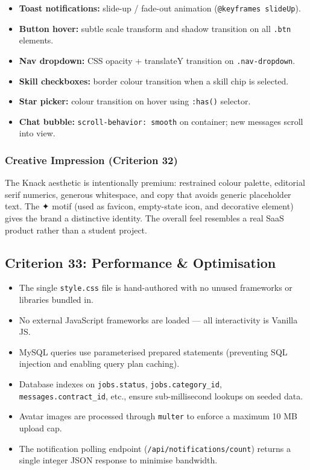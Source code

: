 \documentclass[12pt,a4paper]{article}
\begin{document}
\begin{itemize}[noitemsep]
  \item \textbf{Toast notifications:} slide-up / fade-out animation (\texttt{@keyframes slideUp}).
  \item \textbf{Button hover:} subtle scale transform and shadow transition on all \texttt{.btn} elements.
  \item \textbf{Nav dropdown:} CSS opacity + translateY transition on \texttt{.nav-dropdown}.
  \item \textbf{Skill checkboxes:} border colour transition when a skill chip is selected.
  \item \textbf{Star picker:} colour transition on hover using \texttt{:has()} selector.
  \item \textbf{Chat bubble:} \texttt{scroll-behavior: smooth} on container; new messages scroll into view.
\end{itemize}

\subsubsection{Creative Impression (Criterion 32)}

The Knack aesthetic is intentionally premium: restrained colour palette, editorial serif numerics, generous whitespace, and copy that avoids generic placeholder text. The ✦ motif (used as favicon, empty-state icon, and decorative element) gives the brand a distinctive identity. The overall feel resembles a real SaaS product rather than a student project.

\subsection{Criterion 33: Performance \& Optimisation}

\begin{itemize}[noitemsep]
  \item The single \texttt{style.css} file is hand-authored with no unused frameworks or libraries bundled in.
  \item No external JavaScript frameworks are loaded --- all interactivity is Vanilla JS.
  \item MySQL queries use parameterised prepared statements (preventing SQL injection and enabling query plan caching).
  \item Database indexes on \texttt{jobs.status}, \texttt{jobs.category\_id}, \texttt{messages.contract\_id}, etc., ensure sub-millisecond lookups on seeded data.
  \item Avatar images are processed through \texttt{multer} to enforce a maximum 10 MB upload cap.
  \item The notification polling endpoint (\texttt{/api/notifications/count}) returns a single integer JSON response to minimise bandwidth.
\end{itemize}
\end{document}
